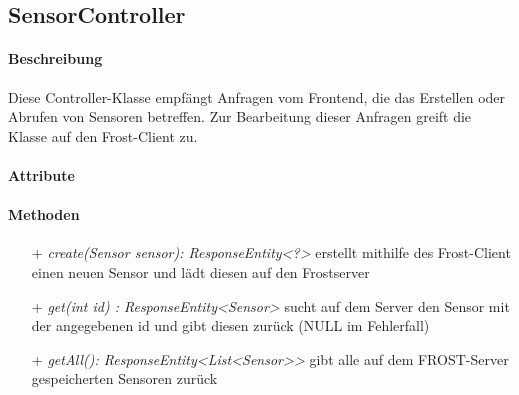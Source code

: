 \subsection{SensorController}

\paragraph{Beschreibung}
Diese Controller-Klasse empfängt Anfragen vom Frontend, die das Erstellen oder Abrufen von Sensoren betreffen. Zur Bearbeitung dieser Anfragen greift die Klasse auf den Frost-Client zu.


\paragraph{Attribute}

\paragraph{Methoden}
\begin{itemize}
\item[+] \textit{ create(Sensor sensor): ResponseEntity<?> }
erstellt mithilfe des Frost-Client einen neuen Sensor und lädt diesen auf den Frostserver
\item[+] \textit{get(int id) : ResponseEntity<Sensor>}
sucht auf dem Server den Sensor mit der angegebenen id und gibt diesen zurück (NULL im Fehlerfall)
\item[+] \textit{getAll(): ResponseEntity<List<Sensor>> }
gibt alle auf dem FROST-Server gespeicherten Sensoren zurück
\end{itemize}